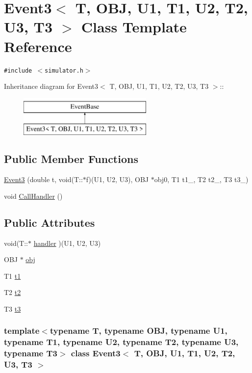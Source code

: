 \hypertarget{classEvent3}{
\section{Event3$<$ T, OBJ, U1, T1, U2, T2, U3, T3 $>$ Class Template Reference}
\label{classEvent3}
}
{\tt \#include $<$simulator.h$>$}

Inheritance diagram for Event3$<$ T, OBJ, U1, T1, U2, T2, U3, T3 $>$::\begin{figure}[H]
\begin{center}
\leavevmode
\includegraphics[height=2cm]{classEvent3}
\end{center}
\end{figure}
\subsection*{Public Member Functions}
\begin{CompactItemize}
\item 
\hyperlink{classEvent3_ab6870a823964c1843b897de6ce2057c}{Event3} (double t, void(T::$\ast$f)(U1, U2, U3), OBJ $\ast$obj0, T1 t1\_, T2 t2\_, T3 t3\_)
\item 
void \hyperlink{classEvent3_1b9501d43723072952055c5abd9dc9be}{CallHandler} ()
\end{CompactItemize}
\subsection*{Public Attributes}
\begin{CompactItemize}
\item 
void(T::$\ast$ \hyperlink{classEvent3_2b4a3b7dbddc1dc7954942e7b2fe5745}{handler} )(U1, U2, U3)
\item 
OBJ $\ast$ \hyperlink{classEvent3_df320f52db00df12079299c183cb84d0}{obj}
\item 
T1 \hyperlink{classEvent3_d42449bd6cd4193bfb6557dc54c51eb8}{t1}
\item 
T2 \hyperlink{classEvent3_40afc3cdc9d75a5b3163795b78a42497}{t2}
\item 
T3 \hyperlink{classEvent3_7aa650837c6a02999bcad51817b144ef}{t3}
\end{CompactItemize}
\subsubsection*{template$<$typename T, typename OBJ, typename U1, typename T1, typename U2, typename T2, typename U3, typename T3$>$ class Event3$<$ T, OBJ, U1, T1, U2, T2, U3, T3 $>$}



